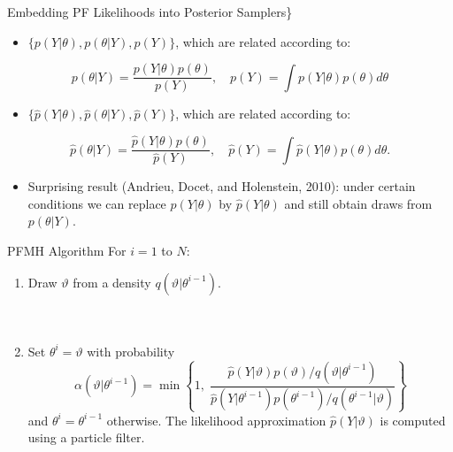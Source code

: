 \documentclass[presentation]{beamer}
\begin{document}
\begin{frame}[label={sec:org8a4c273}]{Embedding PF Likelihoods into Posterior Samplers\}}
\begin{itemize}
\item \(\{ p(Y|\theta), p(\theta|Y), p(Y) \}\), which are related according to:
\end{itemize}
\[
   p(\theta|Y) = \frac{p(Y|\theta) p(\theta)}{p(Y)} , \quad p(Y) = \int p(Y|\theta) p(\theta) d\theta
   \]
\begin{itemize}
\item \(\{ \hat{p}(Y|\theta), \hat{p}(\theta|Y), \hat{p}(Y) \}\), which are related according to:
\end{itemize}
\[
   \hat{p}(\theta|Y) = \frac{\hat{p}(Y|\theta) p(\theta)}{\hat{p}(Y)} , \quad \hat{p}(Y) = \int \hat{p}(Y|\theta) p(\theta) d\theta.
   \]
\begin{itemize}
\item Surprising result (Andrieu, Docet, and Holenstein, 2010): under certain conditions we can replace \(p(Y|\theta)\) by \(\hat{p}(Y|\theta)\) and still obtain draws from \(p(\theta|Y)\).
\end{itemize}
\end{frame}


\begin{frame}[label={sec:org7251c95}]{PFMH Algorithm}
For \(i=1\) to \(N\):
\begin{enumerate}
\item Draw \(\vartheta\) from a density \(q(\vartheta|\theta^{i-1})\).
\\~\\~
\item Set \(\theta^i = \vartheta\) with probability
\[
   \alpha(\vartheta | \theta^{i-1} ) = \min \left\{ 1, \;
   \frac{ \hat{p}(Y| \vartheta )p(\vartheta) / q(\vartheta | \theta^{i-1}) }{
           \hat{p}(Y|\theta^{i-1}) p(\theta^{i-1})	 / q(\theta^{i-1} | \vartheta) } \right\}
   \]
and \(\theta^{i} = \theta^{i-1}\) otherwise. The likelihood approximation \(\hat{p}(Y|\vartheta)\) is computed using a particle filter.
\end{enumerate}
\end{frame}
\end{document}
